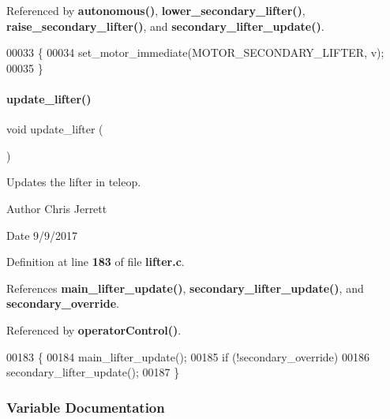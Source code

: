 Referenced by \textbf{ autonomous()}, \textbf{ lower\+\_\+secondary\+\_\+lifter()}, \textbf{ raise\+\_\+secondary\+\_\+lifter()}, and \textbf{ secondary\+\_\+lifter\+\_\+update()}.


\begin{DoxyCode}
00033                                               \{
00034   set_motor_immediate(MOTOR_SECONDARY_LIFTER, v);
00035 \}
\end{DoxyCode}
\mbox{\label{a00107_a59bb7413777ca16aba124aaedf95c79b}} 
\paragraph{update\+\_\+lifter()}
{\footnotesize\ttfamily void update\+\_\+lifter (\begin{DoxyParamCaption}{ }\end{DoxyParamCaption})}



Updates the lifter in teleop. 

\begin{DoxyAuthor}{Author}
Chris Jerrett 
\end{DoxyAuthor}
\begin{DoxyDate}{Date}
9/9/2017 
\end{DoxyDate}


Definition at line \textbf{ 183} of file \textbf{ lifter.\+c}.



References \textbf{ main\+\_\+lifter\+\_\+update()}, \textbf{ secondary\+\_\+lifter\+\_\+update()}, and \textbf{ secondary\+\_\+override}.



Referenced by \textbf{ operator\+Control()}.


\begin{DoxyCode}
00183                      \{
00184   main_lifter_update();
00185   \textcolor{keywordflow}{if} (!secondary_override)
00186     secondary_lifter_update();
00187 \}
\end{DoxyCode}


\subsubsection{Variable Documentation}
\mbox{\label{a00107_afbf11bb950aeb7975e91d0675a0820bc}} 
